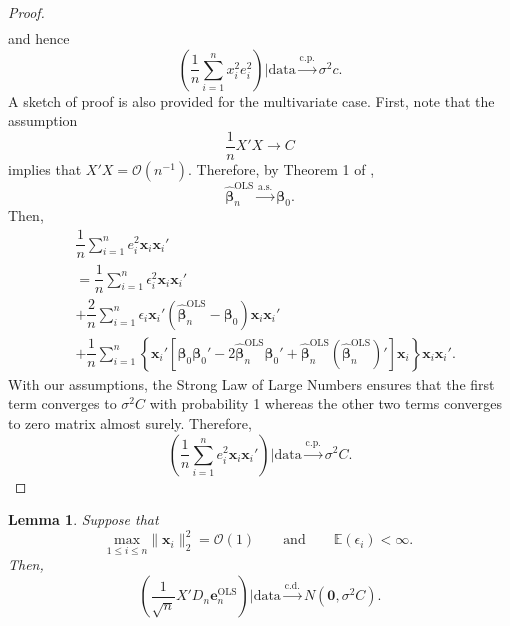 \documentclass[12pt]{article}
\newcommand{\EX}{\mathbb{E}} %
\newcommand{\bLS}{\widehat{\bm{\beta}}_n^{\text{OLS}}} %
\newcommand{\be}{\bm{\beta}} %
\newcommand{\eLS}{\bm{e}_n^{\text{OLS}}} %
\newcommand{\sumin}{\sum_{i=1}^n} %
\newcommand{\dn}{\dfrac{1}{n}} %
\newcommand{\dqn}{\dfrac{1}{\sqrt{n}}} %
\newcommand{\CONV}[1]{\stackrel{\text{#1}}{\longrightarrow}} %
\newcommand{\x}{\bm{x}_i} %
\newtheorem{lem}{Lemma}[section]
\begin{document}
\begin{proof}
\begin{align*}
	\end{align*}
	and hence
	$$
	\left( \dn \sumin x_i^2 e_i^2 \right)
	\bigg| \text{data} 
	\CONV{c.p.} \sigma^2 c.
	$$
	A sketch of proof is also provided for the multivariate case. First, note that the assumption
	$$
	\dn X'X \to C
	$$ 
	implies that $X'X = \mathcal{O} (n^{-1})$. Therefore, by Theorem 1 of \citet{LSEstrong}, 
	$$
	\bLS 
	\CONV{a.s.}
	\be_0.
	$$ 
	Then,
	\begin{align*}
	&\dn \sumin e_i^2 \x \x' \\
	&= \dn \sumin \epsilon_i^2 \x \x' \\
	&+ \dfrac{2}{n} \sumin 
					\epsilon_i \x' 
					\left( \bLS - \be_0 \right)
					\x \x' \\
	&+ \dn \sumin
			\left\{
				\x'\left[
						\be_0 \be_0'
						- 2 \bLS \be_0'
						+ \bLS \left( \bLS \right)' 
				\right] \x 
			\right\} \x \x'.
	\end{align*} 
	With our assumptions, the Strong Law of Large Numbers ensures that the first term converges to $\sigma^2 C$ with probability 1 whereas the other two terms converges to zero matrix almost surely. Therefore,
	 $$
	 \left( \dn \sumin e_i^2 \x \x' \right)
	 \bigg| \text{data} 
	 \CONV{c.p.} \sigma^2 C.
	 $$
\end{proof}

\begin{lem} \label{lem_X'Dne_normal}
	Suppose that 
	$$
	\underset{1 \leq i \leq n}{\text{max}} \| \x \|_2^2 = \mathcal{O} (1)
	\qquad \text{and} \qquad
	\EX (\epsilon_i) < \infty.
	$$
	Then,
	$$
	\left( 
		\dqn X' D_n \eLS 
	\right) \bigg| \text{data}
	\CONV{c.d.} 
	N \left( \bm{0}, \sigma^2 C \right).
	$$
\end{lem} 
\end{document}
